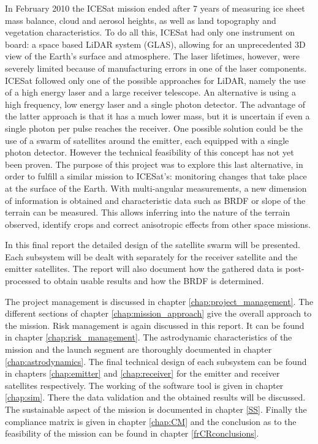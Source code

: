 In February 2010 the ICESat mission ended after 7 years of measuring ice sheet mass balance, cloud and aerosol heights, as well as land topography and vegetation characteristics.
To do all this, ICESat had only one instrument on board: a space based \ac{LiDAR} system (\ac{GLAS}), allowing for an unprecedented 3D view of the Earth's surface and atmosphere.
The laser lifetimes, however, were severely limited because of manufacturing errors in one of the laser components.
ICESat followed only one of the possible approaches for \ac{LiDAR}, namely the use of a high energy laser and a large receiver telescope. An alternative is using a high frequency, low energy laser and a single photon detector. The advantage of the latter approach is that it has a much lower mass, but it is uncertain if even a single photon per pulse reaches the receiver. One possible solution could be the use of a swarm of satellites around the emitter, each equipped with a single photon detector. However the technical feasibility of this concept has not yet been proven.
The purpose of this project was to explore this last alternative, in order to fulfill a similar mission to ICESat's: monitoring changes that take place at the surface of the Earth. With multi-angular measurements, a new dimension of information is obtained and characteristic data such as \acs{BRDF} or slope of the terrain can be measured. This allows inferring into the nature of the terrain observed, identify crops and correct anisotropic effects from other space missions.

In this final report the detailed design of the satellite swarm will be presented. Each subsystem will be dealt with separately for the receiver satellite and the emitter satellites. The report will also document how the gathered data is post-processed to obtain usable results and how the \acs{BRDF} is determined.

The project management is discussed in chapter \ref{chap:project_management}. The different sections of chapter \ref{chap:mission_approach} give the overall approach to the mission. Risk management is again discussed in this report. It can be found in chapter \ref{chap:risk_management}. The astrodynamic characteristics of the mission and the launch segment are thoroughly documented in chapter \ref{chap:astrodynamics}. The final technical design of each subsystem can be found in chapters \ref{chap:emitter} and \ref{chap:receiver} for the emitter and receiver satellites respectively.
The working of the software tool is given in chapter \ref{chap:sim}. There the data validation and the obtained results will be discussed. The sustainable aspect of the mission is documented in chapter \ref{SS}. 
Finally the compliance matrix is given in chapter \ref{chap:CM} and the conclusion as to the feasibility of the mission can be found in chapter \ref{frCRconclusions}.

